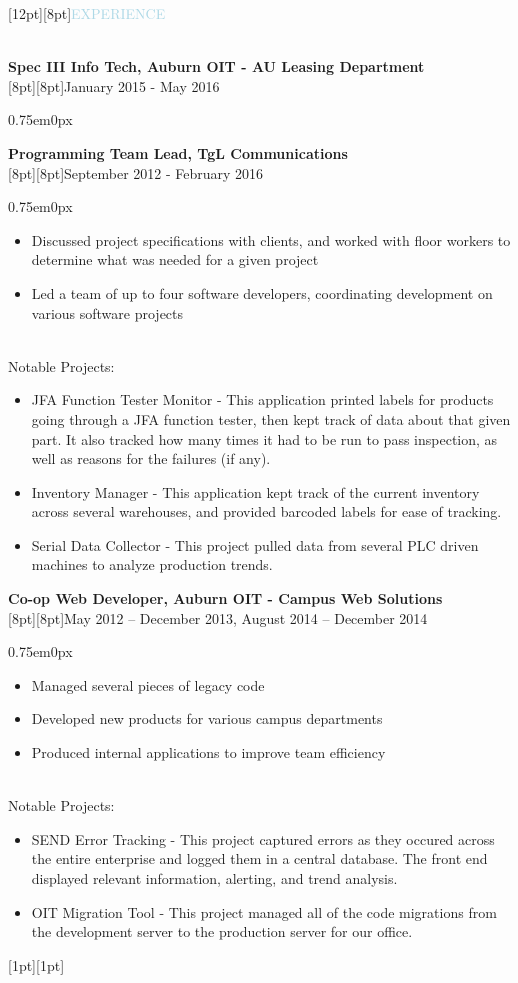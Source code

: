\documentclass[12pt]{res}
\newenvironment{ResumeBlock}[1]
{
	\begin{large}
		\raisebox{0pt}[12pt][8pt]{\textcolor{lightblue}{#1}}
	\end{large}
	\\
}
{	
}
\newenvironment{DetailsBlock}[2]
{
	\textbf{\color{darkfont}#1}
	\\
	\raisebox{0pt}[8pt][8pt]{#2}
	\begin{adjustwidth}{0.75em}{0px}
}
{	
	\end{adjustwidth}
}
\begin{document}
\begin{ResumeBlock}{EXPERIENCE}
\begin{DetailsBlock}{Spec III Info Tech, Auburn OIT - AU Leasing Department}{January 2015 - May 2016}
\begin{itemize}
			\end{itemize}
		\end{DetailsBlock}		
		\begin{DetailsBlock}{Programming Team Lead, TgL Communications}{September 2012 - February 2016}
			\begin{itemize}
				\item Discussed project specifications with clients, and worked with floor workers to determine what was needed for a given project 
				\item Led a team of up to four software developers, coordinating development on various software projects
			\end{itemize}
			~\\
			Notable Projects:
			\begin{itemize}
				\item JFA Function Tester Monitor - This application printed labels for products going through a JFA function tester, then kept track of data about that given part.  It also tracked how many times it had to be run to pass inspection, as well as reasons for the failures (if any).
				\item Inventory Manager - This application kept track of the current inventory across several warehouses, and provided barcoded labels for ease of tracking. 
				\item Serial Data Collector - This project pulled data from several PLC driven machines to analyze production trends.   
			\end{itemize}
		\end{DetailsBlock}		
		\begin{DetailsBlock}{Co-op Web Developer, Auburn OIT - Campus Web Solutions}{May 2012 – December 2013, August 2014 – December 2014 }
			\begin{itemize}
				\item Managed several pieces of legacy code
				\item Developed new products for various campus departments 
				\item Produced internal applications to improve team efficiency 
			\end{itemize}
			~\\
			Notable Projects:
			\begin{itemize}
				\item SEND Error Tracking - This project captured errors as they occured across the entire enterprise and logged them in a central database.  The front end displayed relevant information, alerting, and trend analysis. 
				\item OIT Migration Tool - This project managed all of the code migrations from the development server to the production server for our office.
			\end{itemize}
			\raisebox{0pt}[1pt][1pt]{\space}
		\end{DetailsBlock}
	\end{ResumeBlock}	
\end{document}
